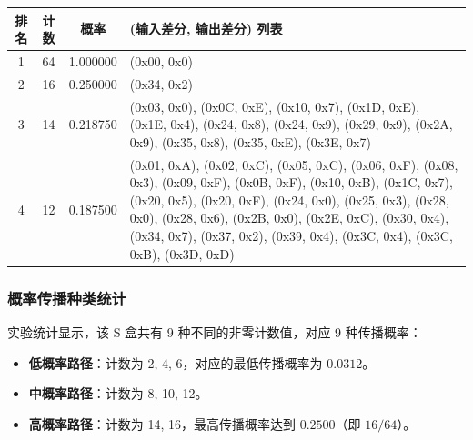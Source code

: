 \documentclass[12pt,a4paper]{article}
\begin{document}
\begin{table}[H]
\centering
\caption{S1 盒高概率差分路径汇总表}
\begin{small}
\begin{longtable}{|c|c|c|p{8cm}|}
\hline
\textbf{排名} & \textbf{计数} & \textbf{概率} & \textbf{(输入差分, 输出差分) 列表} \\ \hline
1 & 64 & 1.000000 & (0x00, 0x0) \\ \hline
2 & 16 & 0.250000 & (0x34, 0x2) \\ \hline
3 & 14 & 0.218750 & (0x03, 0x0), (0x0C, 0xE), (0x10, 0x7), (0x1D, 0xE), (0x1E, 0x4), (0x24, 0x8), (0x24, 0x9), (0x29, 0x9), (0x2A, 0x9), (0x35, 0x8), (0x35, 0xE), (0x3E, 0x7) \\ \hline
4 & 12 & 0.187500 & (0x01, 0xA), (0x02, 0xC), (0x05, 0xC), (0x06, 0xF), (0x08, 0x3), (0x09, 0xF), (0x0B, 0xF), (0x10, 0xB), (0x1C, 0x7), (0x20, 0x5), (0x20, 0xF), (0x24, 0x0), (0x25, 0x3), (0x28, 0x0), (0x28, 0x6), (0x2B, 0x0), (0x2E, 0xC), (0x30, 0x4), (0x34, 0x7), (0x37, 0x2), (0x39, 0x4), (0x3C, 0x4), (0x3C, 0xB), (0x3D, 0xD) \\ \hline
\end{longtable}
\end{small}
\end{table}

\subsubsection{概率传播种类统计}
实验统计显示，该 S 盒共有 9 种不同的非零计数值，对应 9 种传播概率：
\begin{itemize}
    \item \textbf{低概率路径}：计数为 2, 4, 6，对应的最低传播概率为 $0.0312$。
    \item \textbf{中概率路径}：计数为 8, 10, 12。
    \item \textbf{高概率路径}：计数为 14, 16，最高传播概率达到 $0.2500$（即 $16/64$）。
\end{itemize}
\end{document}
